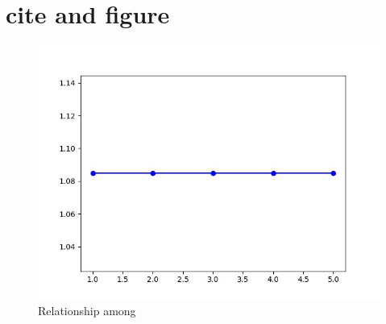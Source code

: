 \documentclass[letterpaper, 12pt]{article}
\begin{document}
\section*{cite and figure}


\begin{figure}
  \includegraphics[width=\linewidth]{fig/pic1.jpg}
  \caption{Relationship among }
  \label{fig:relation1}
\end{figure}



\end{document}

